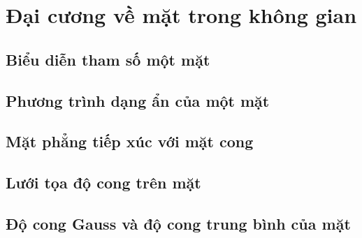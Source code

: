 \chapter{Đại cương về mặt trong không gian}
\section{Biểu diễn tham số một mặt}
\section{Phương trình dạng ẩn của một mặt}
\section{Mặt phẳng tiếp xúc với mặt cong}
\section{Lưới tọa độ cong trên mặt}
\section{Độ cong Gauss và độ cong trung bình của mặt}
